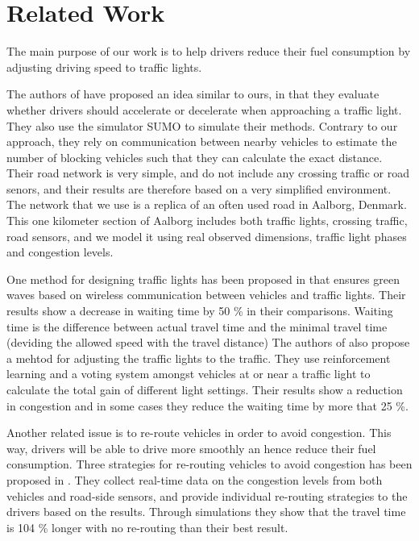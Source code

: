 \section{Related Work}

The main purpose of our work is to help drivers reduce their fuel consumption by adjusting driving speed to traffic lights.

The authors of \cite{VANETsim} have proposed an idea similar to ours, in that they evaluate whether drivers should accelerate or decelerate when approaching a traffic light.
They also use the simulator SUMO to simulate their methods. 
Contrary to our approach, they rely on communication between nearby vehicles to estimate the number of blocking vehicles such that they can calculate the exact distance.
Their road network is very simple, and do not include any crossing traffic or road senors, and their results are therefore based on a very simplified environment. 
The network that we use is a replica of an often used road in Aalborg, Denmark. 
This one kilometer section of Aalborg includes both traffic lights, crossing traffic, road sensors, and we model it using real observed dimensions, traffic light phases and congestion levels.

One method for designing traffic lights has been proposed in \cite{SOTL} that ensures green waves based on wireless communication between vehicles and traffic lights. Their results show a decrease in waiting time by 50 \% in their comparisons. 
Waiting time is the difference between actual travel time and the minimal travel time (deviding the allowed speed with the travel distance)
The authors of \cite{ITLC} also propose a mehtod for adjusting the traffic lights to the traffic. 
They use reinforcement learning and a voting system amongst vehicles at or near a traffic light to calculate the total gain of different light settings. 
Their results show a reduction in congestion and in some cases they reduce the waiting time by more that 25 \%.

Another related issue is to re-route vehicles in order to avoid congestion. 
This way, drivers will be able to drive more smoothly an hence reduce their fuel consumption. 
Three strategies for re-routing vehicles to avoid congestion has been proposed in \cite{congestionAvoidance}. 
They collect real-time data on the congestion levels from both vehicles and road-side sensors, and provide individual re-routing strategies to the drivers based on the results. 
Through simulations they show that the travel time is 104 \% longer with no re-routing than their best result.

